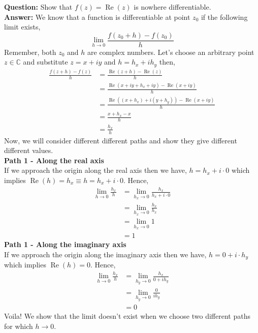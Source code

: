 \begin{example}
    \textbf{Question:} Show that $f(z)=\operatorname{Re}(z)$ is nowhere differentiable.\\
    \textbf{Answer:} We know that a function is differentiable at point $z_0$ if the following limit exists, $$\lim_{h\rightarrow0}\frac{f(z_0+h)-f(z_0)}{h}$$
    Remember, both $z_0$ and $h$ are complex numbers. Let's choose an arbitrary point $z\in\mathbb{C}$ and substitute $z=x+iy$ and $h=h_x+ih_y$ then, 
    \begin{align*}
        \frac{f(z+h)-f(z)}{h}&=\frac{\operatorname{Re}(z+h)-\operatorname{Re}(z)}{h}\\
        &= \frac{\operatorname{Re}(x+iy+h_x+iy)-\operatorname{Re}(x+iy)}{h}\\
        &= \frac{\operatorname{Re}((x+h_x)+i(y+h_y))-\operatorname{Re}(x+iy)}{h}\\
        &= \frac{x+h_x-x}{h}\\
        &= \frac{h_x}{h}
    \end{align*}
    Now, we will consider different different paths and show they give different different values.\\ 
    \textbf{Path 1 - Along the real axis}\\
    If we approach the origin along the real axis then we have, $h=h_x+i\cdot 0$ which implies $\operatorname{Re}(h)=h_x\equiv h=h_x+i\cdot0$. Hence, 
    \begin{align*}
        \lim_{h\rightarrow0} \frac{h_x}{h}&= \lim_{h_x\rightarrow0} \frac{h_x}{h_x+i\cdot0}\\
        &= \lim_{h_x\rightarrow0} \frac{h_x}{h_x}\\
        &= \lim_{h_x\rightarrow0} 1\\
        &= 1
    \end{align*}
    \textbf{Path 1 - Along the imaginary axis}\\
    If we approach the origin along the imaginary axis then we have, $h=0+i\cdot h_y$ which implies $\operatorname{Re}(h)=0$. Hence,
    \begin{align*}
        \lim_{h\rightarrow0} \frac{h_x}{h}&= \lim_{h_y\rightarrow0} \frac{h_x}{0+ih_y}\\
        &= \lim_{h_y\rightarrow0} \frac{0}{ih_y}\\
        &= 0
    \end{align*}
    Voila! We show that the limit doesn't exist when we choose two different paths for which $h\rightarrow0$.\\~\\ 

\end{example}
